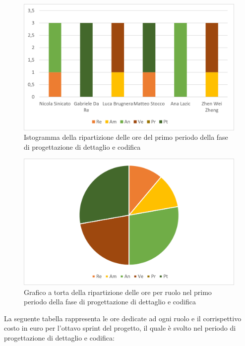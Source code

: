 \begin{figure}[H]
    \centering
    \includegraphics[scale=0.6]{img/grafi preventivo/istogrammi/codifica/periodo1.png}
    \caption{Istogramma della ripartizione delle ore del primo periodo della fase di progettazione di dettaglio e codifica}
\end{figure}
\begin{figure}[H]
    \centering
    \includegraphics[scale=0.6]{img/grafi preventivo/torta/codifica/periodo1.png}
    \caption{Grafico a torta della ripartizione delle ore per ruolo nel primo periodo della fase di progettazione di dettaglio e codifica}
\end{figure}
La seguente tabella rappresenta le ore dedicate ad ogni ruolo e il corrispettivo costo in euro per l'ottavo sprint del progetto, il quale è svolto nel periodo di progettazione di dettaglio e codifica:


